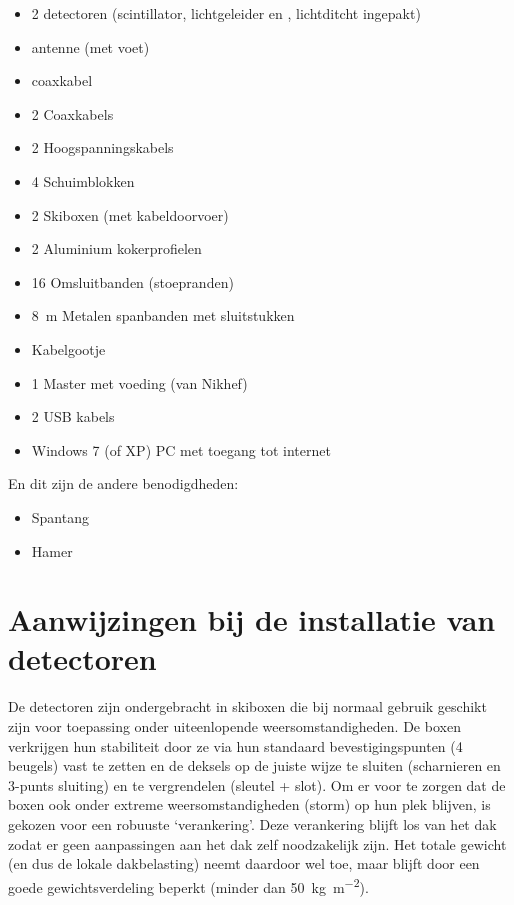 \begin{itemize}
    \item 2 \hisparc detectoren (scintillator, lichtgeleider en \pmt,
    lichtditcht ingepakt)
    \item \gps antenne (met voet)
    \item \gps coaxkabel
    \item 2 Coaxkabels
    \item 2 Hoogspanningskabels
    \item 4 Schuimblokken
    \item 2 Skiboxen (met kabeldoorvoer)
    \item 2 Aluminium kokerprofielen
    \item 16 Omsluitbanden (stoepranden)
    \item \SI{8}{\meter} Metalen spanbanden met sluitstukken
    \item Kabelgootje
    \item 1 \hisparc Master met voeding (van Nikhef)
    \item 2 USB kabels
    \item Windows 7 (of XP) PC met toegang tot internet
\end{itemize}

En dit zijn de andere benodigdheden:

\begin{itemize}
    \item Spantang
    \item Hamer
\end{itemize}


\section{Aanwijzingen bij de installatie van \hisparc detectoren}

De \hisparc detectoren zijn ondergebracht in skiboxen die bij normaal
gebruik geschikt zijn voor toepassing onder uiteenlopende
weersomstandigheden. De boxen verkrijgen hun stabiliteit door ze via hun
standaard bevestigingspunten (4 beugels) vast te zetten en de deksels op
de juiste wijze te sluiten (scharnieren en 3-punts sluiting) en te
vergrendelen (sleutel + slot). Om er voor te zorgen dat de boxen ook
onder extreme weersomstandigheden (storm) op hun plek blijven, is
gekozen voor een robuuste ‘verankering’. Deze verankering blijft los van
het dak zodat er geen aanpassingen aan het dak zelf noodzakelijk zijn.
Het totale gewicht (en dus de lokale dakbelasting) neemt daardoor wel
toe, maar blijft door een goede gewichtsverdeling beperkt (minder dan
\SI{50}{\kilo\gram\per\square\meter}).

